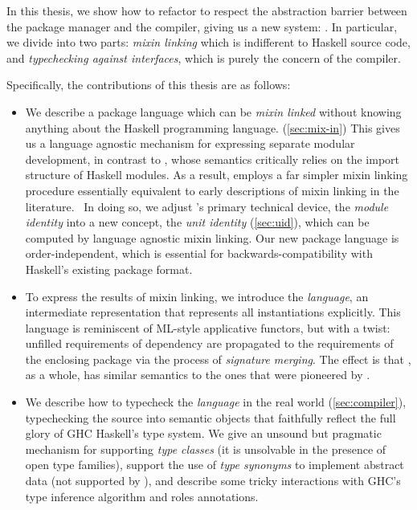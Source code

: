 In this thesis, we show how to refactor
\OldBackpack{} to respect the abstraction barrier between the package
manager and the compiler, giving us a new system: \Backpack{}.  In
particular, we divide \Backpack{} into two parts: \emph{mixin linking}
which is indifferent to Haskell source code, and \emph{typechecking against
interfaces}, which is purely the concern of the compiler.

Specifically, the contributions of this thesis are as follows:
\begin{itemize}

    \item We describe a package language which can be \emph{mixin
    linked} without knowing anything about the Haskell programming
    language. (\cref{sec:mix-in})  This gives us a language agnostic mechanism for
    expressing separate modular development, in contrast to
    \OldBackpack{}, whose semantics critically relies on the import structure
    of Haskell modules.  As a result, \Backpack{}
    employs a far simpler mixin linking procedure essentially equivalent
    to early descriptions of mixin linking in the literature.~\cite{cardelli:linksets}
    In doing so, we adjust \OldBackpack{}'s primary technical device,
    the \emph{module identity} into a new concept, the \emph{unit identity} (\cref{sec:uid}),
    which can be computed by language agnostic mixin linking.
    Our new package language is order-independent, which is
    essential for backwards-compatibility with Haskell's existing
    package format.

    \item To express the results of mixin linking, we introduce the
    \emph{\unit{} language}, an intermediate representation that
    represents all instantiations explicitly.  This language is reminiscent of
    ML-style applicative functors, but with a twist:
    unfilled requirements of dependency are propagated to the requirements
    of the enclosing package via the process of \emph{signature merging}.
    The effect is that \Backpack{}, as a whole, has similar
    semantics to the ones that were pioneered by \OldBackpack{}.

    \item We describe how to typecheck the \emph{\unit{} language} in the
    real world (\cref{sec:compiler}), typechecking the source into semantic objects that
    faithfully reflect the full glory of GHC Haskell's type system.
    We give an unsound but pragmatic mechanism for supporting \emph{type classes}
    (it is unsolvable in the presence of open type families), support
    the use of \emph{type synonyms} to implement abstract data
    (not supported by \OldBackpack{}), and describe
    some tricky interactions with GHC's type inference algorithm and
    roles annotations.


\end{itemize}
